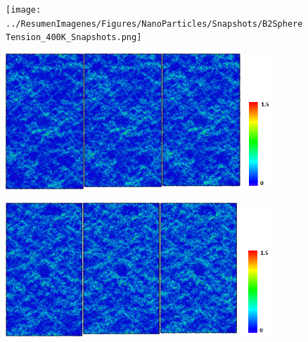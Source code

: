 \begin{figure}[htp]
\centering
\texttt{[image: ../ResumenImagenes/Figures/NanoParticles/Snapshots/B2SphereTension\_400K\_Snapshots.png]}
\caption[Inclusión de CuZr-B2 bajo tracción a 400K]{}
\label{C4:fg:snapshot_ten_B2_400K}
\end{figure}

\begin{figure}[htp]
\centering
\includegraphics[width=10cm]{../ResumenImagenes/Figures/NanoParticles/Snapshots/B2SphereCompression_10K_Snapshots.png}
\caption[Inclusión de CuZr-B2 bajo compresión a 10K]{}
\label{C4:fg:snapshot_comp_B2_10K}
\end{figure}

\begin{figure}[htp]
\centering
\includegraphics[width=10cm]{../ResumenImagenes/Figures/NanoParticles/Snapshots/B2SphereCompression_200K_Snapshots.png}
\caption[Inclusión de CuZr-B2 bajo compresión a 200K]{}
\label{C4:fg:snapshot_comp_B2_200K}
\end{figure}

